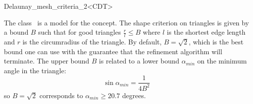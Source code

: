 \begin{ccRefClass}{Delaunay_mesh_criteria_2<CDT>}

\ccDefinition
  
The class \ccRefName\ is a model for the  concept.
The shape criterion on triangles is given by a bound $B$ such that for good
triangles $\frac{r}{l} \le B$ where $l$ is the shortest edge length
and $r$ is the circumradius of the triangle.  By default, $B=\sqrt{2}$,
which is the best bound one can use with the guarantee that the refinement
algorithm will terminate. The upper bound $B$ is related to a lower bound
$\alpha_{min}$ on the minimum angle in the triangle:
\begin{displaymath}
  \sin{ \alpha_{min} } = \frac{1}{4 B^2}
\end{displaymath}
so $B=\sqrt{2}$ corresponds to  $\alpha_{min} \ge 20.7$ degrees.


\ccIsModel


\ccCreation
{}
\end{ccRefClass}

